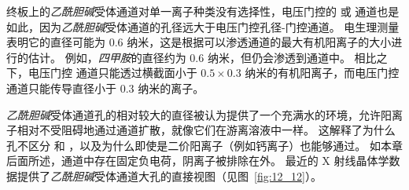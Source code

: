 终板上的\textit{乙酰胆碱}受体通道对单一离子种类没有选择性，电压门控的  或  通道也是如此，因为\textit{乙酰胆碱}受体通道的孔径远大于电压门控孔径-门控通道。
电生理测量表明它的直径可能为 0.6 纳米，这是根据可以渗透通道的最大有机阳离子的大小进行的估计。
例如，\textit{四甲胺}的直径约为 0.6 纳米，但仍会渗透到通道中。
相比之下，电压门控  通道只能透过横截面小于 $ 0.5 \times 0.3 $ 纳米的有机阳离子，而电压门控  通道只能传导直径小于 0.3 纳米的离子。


\textit{乙酰胆碱}受体通道孔的相对较大的直径被认为提供了一个充满水的环境，允许阳离子相对不受阻碍地通过通道扩散，就像它们在游离溶液中一样。
这解释了为什么孔不区分  和 ，以及为什么即使是二价阳离子（例如钙离子）也能够通过。
如本章后面所述，通道中存在固定负电荷，阴离子被排除在外。
最近的 X 射线晶体学数据提供了\textit{乙酰胆碱}受体通道大孔的直接视图（见图~\ref{fig:12_12}）。



